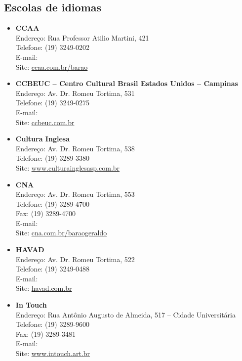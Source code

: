 \subsection{Escolas de idiomas}

\begin{itemize}
    \item   \textbf{CCAA}
        \\Endereço: Rua Professor Atilio Martini, 421
        \\Telefone: (19) 3249-0202
        \\E-mail: 
        \\Site: \url{ccaa.com.br/barao}

    \item   \textbf{CCBEUC -- Centro Cultural Brasil Estados Unidos --
    Campinas}
        \\Endereço: Av. Dr. Romeu Tortima, 531
        \\Telefone: (19) 3249-0275
        \\E-mail: 
        \\Site: \url{ccbeuc.com.br}

    \item   \textbf{Cultura Inglesa}
        \\Endereço: Av. Dr. Romeu Tortima, 538
        \\Telefone: (19) 3289-3380
        \\Site: \url{www.culturainglesasp.com.br}

    \item   \textbf{CNA}
        \\Endereço: Av. Dr. Romeu Tortima, 553
        \\Telefone: (19) 3289-4700
        \\Fax: (19) 3289-4700
        \\E-mail: 
        \\Site: \url{cna.com.br/baraogeraldo}

    \item   \textbf{HAVAD}
        \\Endereço: Av. Dr. Romeu Tortima, 522
        \\Telefone: (19) 3249-0488
        \\E-mail: 
        \\Site: \url{havad.com.br}

    \item   \textbf{In Touch}
        \\Endereço: Rua Antônio Augusto de Almeida, 517 -- Cidade Universitária
        \\Telefone: (19) 3289-9600
        \\Fax: (19) 3289-3481
        \\E-mail: 
        \\Site: \url{www.intouch.art.br}


\end{itemize}
